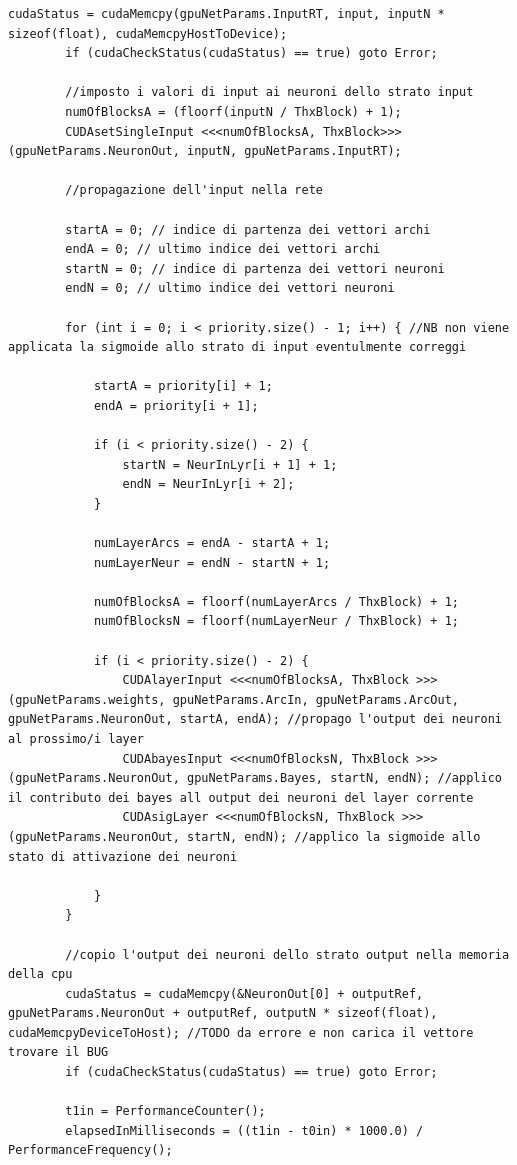 \documentclass[10pt,a4paper]{article}
\begin{document}
\begin{lstlisting}[style=mycuda, caption= classe di interfaccia alla GPU, captionpos=b]
		cudaStatus = cudaMemcpy(gpuNetParams.InputRT, input, inputN * sizeof(float), cudaMemcpyHostToDevice);
		if (cudaCheckStatus(cudaStatus) == true) goto Error;

		//imposto i valori di input ai neuroni dello strato input
		numOfBlocksA = (floorf(inputN / ThxBlock) + 1);
		CUDAsetSingleInput <<<numOfBlocksA, ThxBlock>>> (gpuNetParams.NeuronOut, inputN, gpuNetParams.InputRT);
		
		//propagazione dell'input nella rete

		startA = 0; // indice di partenza dei vettori archi
		endA = 0; // ultimo indice dei vettori archi
		startN = 0; // indice di partenza dei vettori neuroni
		endN = 0; // ultimo indice dei vettori neuroni

		for (int i = 0; i < priority.size() - 1; i++) { //NB non viene applicata la sigmoide allo strato di input eventulmente correggi

			startA = priority[i] + 1;
			endA = priority[i + 1];

			if (i < priority.size() - 2) {
				startN = NeurInLyr[i + 1] + 1;
				endN = NeurInLyr[i + 2];
			}

			numLayerArcs = endA - startA + 1;
			numLayerNeur = endN - startN + 1;

			numOfBlocksA = floorf(numLayerArcs / ThxBlock) + 1;
			numOfBlocksN = floorf(numLayerNeur / ThxBlock) + 1;

			if (i < priority.size() - 2) {
				CUDAlayerInput <<<numOfBlocksA, ThxBlock >>> (gpuNetParams.weights, gpuNetParams.ArcIn, gpuNetParams.ArcOut, gpuNetParams.NeuronOut, startA, endA); //propago l'output dei neuroni al prossimo/i layer
				CUDAbayesInput <<<numOfBlocksN, ThxBlock >>> (gpuNetParams.NeuronOut, gpuNetParams.Bayes, startN, endN); //applico il contributo dei bayes all output dei neuroni del layer corrente 
				CUDAsigLayer <<<numOfBlocksN, ThxBlock >>> (gpuNetParams.NeuronOut, startN, endN); //applico la sigmoide allo stato di attivazione dei neuroni
				
			}
		}

		//copio l'output dei neuroni dello strato output nella memoria della cpu
		cudaStatus = cudaMemcpy(&NeuronOut[0] + outputRef, gpuNetParams.NeuronOut + outputRef, outputN * sizeof(float), cudaMemcpyDeviceToHost); //TODO da errore e non carica il vettore trovare il BUG
		if (cudaCheckStatus(cudaStatus) == true) goto Error;
			
		t1in = PerformanceCounter();
		elapsedInMilliseconds = ((t1in - t0in) * 1000.0) / PerformanceFrequency();


\end{lstlisting}
\end{document}
